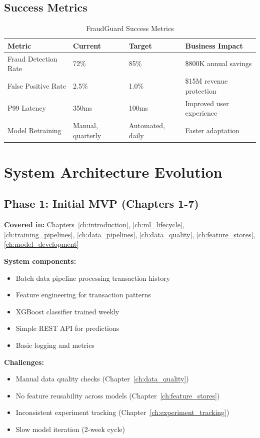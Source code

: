 \subsection{Success Metrics}

\begin{table}[h]
\centering
\caption{FraudGuard Success Metrics}
\begin{tabular}{@{}p{3.4cm}p{3cm}p{3cm}p{4cm}@{}}
\toprule
\textbf{Metric} & \textbf{Current} & \textbf{Target} & \textbf{Business Impact} \\
\midrule
Fraud Detection Rate & 72\% & 85\% & \$800K annual savings \\
False Positive Rate & 2.5\% & 1.0\% & \$15M revenue protection \\
P99 Latency & 350ms & 100ms & Improved user experience \\
Model Retraining & Manual, quarterly & Automated, daily & Faster adaptation \\
\bottomrule
\end{tabular}
\end{table}

\section{System Architecture Evolution}

\subsection{Phase 1: Initial MVP (Chapters 1-7)}

\textbf{Covered in:} Chapters~\ref{ch:introduction}, \ref{ch:ml_lifecycle}, \ref{ch:training_pipelines}, \ref{ch:data_pipelines}, \ref{ch:data_quality}, \ref{ch:feature_stores}, \ref{ch:model_development}

\textbf{System components:}
\begin{itemize}
    \item Batch data pipeline processing transaction history
    \item Feature engineering for transaction patterns
    \item XGBoost classifier trained weekly
    \item Simple REST API for predictions
    \item Basic logging and metrics
\end{itemize}

\textbf{Challenges:}
\begin{itemize}
    \item Manual data quality checks (Chapter~\ref{ch:data_quality})
    \item No feature reusability across models (Chapter~\ref{ch:feature_stores})
    \item Inconsistent experiment tracking (Chapter~\ref{ch:experiment_tracking})
    \item Slow model iteration (2-week cycle)
\end{itemize}


